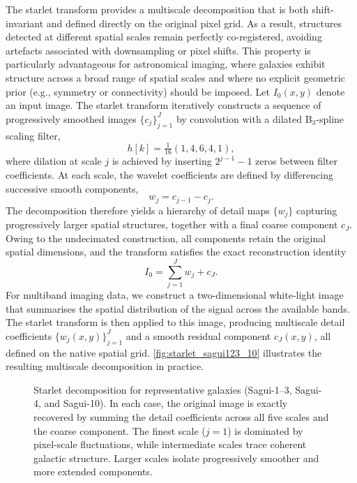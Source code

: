 \documentclass[fleqn,usenatbib]{mnras}
\begin{document}
The starlet transform provides a multiscale decomposition that is both shift-invariant and defined directly on the original pixel grid. As a result, structures detected at different spatial scales remain perfectly co-registered, avoiding artefacts associated with downsampling or pixel shifts. This property is particularly advantageous for astronomical imaging, where galaxies exhibit structure across a broad range of spatial scales and where no explicit geometric prior (e.g., symmetry or connectivity) should be imposed.
%
Let $I_0(x,y)$ denote an input image.  
The starlet transform iteratively constructs a sequence of progressively smoothed images $\{c_j\}_{j=1}^J$ by convolution with a dilated
B$_3$-spline scaling filter,
\begin{equation}
h[k] = \tfrac{1}{16}(1,4,6,4,1),
\end{equation}
where dilation at scale $j$ is achieved by inserting $2^{j-1}-1$ zeros
between filter coefficients.
At each scale, the wavelet coefficients are defined by differencing successive smooth components,
\begin{equation}
w_j = c_{j-1} - c_j .
\end{equation}
The decomposition therefore yields a hierarchy of detail maps $\{w_j\}$ capturing progressively larger spatial structures, together with a final coarse component $c_J$. Owing to the undecimated construction, all components retain the original spatial dimensions, and the transform satisfies the exact reconstruction identity
\begin{equation}
I_0 = \sum_{j=1}^J w_j + c_J .
\end{equation}
For multiband imaging data, we construct a two-dimensional white-light image that summarises the spatial distribution of the signal across the available bands. The starlet transform is then applied to this image, producing multiscale detail coefficients $\{w_j(x,y)\}_{j=1}^{J}$ and a smooth residual component $c_J(x,y)$, all defined on the native spatial grid. \autoref{fig:starlet_sagui123_10} illustrates the resulting multiscale decomposition in practice.


\begin{figure}
\centering
{}
\caption{Starlet decomposition for representative galaxies (Sagui-1–3, Sagui-4, and Sagui-10). In each case, the original image is exactly recovered by summing the detail coefficients across all five scales and the coarse component. The finest scale ($j=1$) is dominated by pixel-scale fluctuations, while intermediate scales trace coherent galactic structure. Larger scales isolate progressively smoother and more extended components.}
\label{fig:starlet_sagui123_10}
\end{figure}
\end{document}
